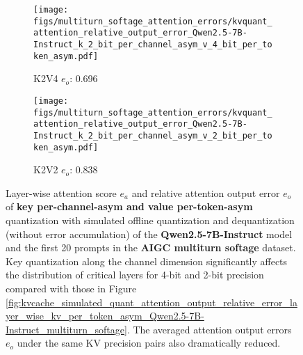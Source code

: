 \begin{figure*}
\begin{subfigure}{0.25\columnwidth}
    \texttt{[image: figs/multiturn\_softage\_attention\_errors/kvquant\_attention\_relative\_output\_error\_Qwen2.5-7B-Instruct\_k\_2\_bit\_per\_channel\_asym\_v\_4\_bit\_per\_token\_asym.pdf]}
    \caption{K2V4 $e_o$: 0.696}
    \label{fig:kvcache_simulated_quant_error_layer_wise_k2_bit_per_channel_asym_v4_per_token_asym_Qwen2.5-7B-Instruct_multirurn_softage}
    \end{subfigure}
    \begin{subfigure}{0.25\columnwidth}
    \texttt{[image: figs/multiturn\_softage\_attention\_errors/kvquant\_attention\_relative\_output\_error\_Qwen2.5-7B-Instruct\_k\_2\_bit\_per\_channel\_asym\_v\_2\_bit\_per\_token\_asym.pdf]}
    \caption{K2V2 $e_o$: 0.838}
    \label{fig:kvcache_simulated_quant_error_layer_wise_k2_bit_per_channel_asym_v2_per_token_asym_Qwen2.5-7B-Instruct_multirurn_softage}
    \end{subfigure}
    \caption{Layer-wise attention score $e_a$ and relative attention output error $e_o$ of \textbf{key per-channel-asym and value per-token-asym} quantization with simulated offline quantization and dequantization (without error accumulation) of the \textbf{Qwen2.5-7B-Instruct} model and the first 20 prompts in the \textbf{AIGC multiturn softage} dataset. Key quantization along the channel dimension significantly affects the distribution of critical layers for 4-bit and 2-bit precision compared with those in Figure \ref{fig:kvcache_simulated_quant_attention_output_relative_error_layer_wise_kv_per_token_asym_Qwen2.5-7B-Instruct_multiturn_softage}. The averaged attention output errors $e_o$ under the same KV precision pairs also dramatically reduced. }
\label{fig:kvcache_simulated_quant_attention_output_relative_error_layer_wise_k_bit_per_channel_asym__v_per_token_asym_Qwen2.5-7B-Instruct_multiturn_softage}
\end{figure*}

